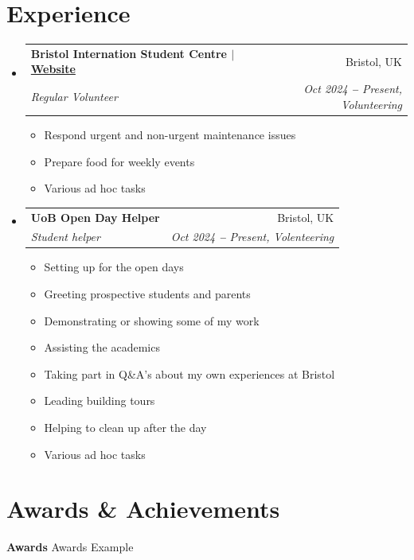 \documentclass[letterpaper,11pt]{article}
\makeatletter
\newcommand{\resumeItem}[1]{
  \item\small{
    {#1 \vspace{-2pt}}
  }
}
\newcommand{\resumeSubheading}[4]{
  \vspace{-2pt}\item
    \begin{tabular*}{0.97\textwidth}[t]{l@{\extracolsep{\fill}}r}
      \textbf{#1} & #2 \\
      \textit{\small#3} & \textit{\small #4} \\
    \end{tabular*}\vspace{-7pt}
}
\newcommand{\resumeSubHeadingListStart}{\begin{itemize}[leftmargin=0.15in, label={}]}
\newcommand{\resumeSubHeadingListEnd}{\end{itemize}}
\newcommand{\resumeItemListStart}{\begin{itemize}}
\newcommand{\resumeItemListEnd}{\end{itemize}\vspace{-5pt}}
\makeatother
\begin{document}

\section{Experience}
  \vspace{3pt}
  \resumeSubHeadingListStart

    \resumeSubheading
      {Bristol Internation Student Centre $|$ \href{https://bisc.org.uk}{\color{blue}Website}}{Bristol, UK}
      {Regular Volunteer}{Oct 2024 \textbf{--} Present, Volunteering}
        \resumeItemListStart
            \resumeItem{Respond urgent and non-urgent maintenance issues}
            \resumeItem{Prepare food for weekly events}
            \resumeItem{Various ad hoc tasks}
        \resumeItemListEnd

    \resumeSubheading
      {UoB Open Day Helper}{Bristol, UK}
      {Student helper}{Oct 2024 \textbf{--} Present, Volenteering}
        \resumeItemListStart
            \resumeItem{Setting up for the open days}
            \resumeItem{Greeting prospective students and parents}
            \resumeItem{Demonstrating or showing some of my work}
            \resumeItem{Assisting the academics}
            \resumeItem{Taking part in Q\&A's about my own experiences at Bristol}
            \resumeItem{Leading building tours}
            \resumeItem{Helping to clean up after the day}
            \resumeItem{Various ad hoc tasks}
        \resumeItemListEnd

\resumeSubHeadingListEnd



\section{Awards \& Achievements}
  \vspace{2pt}
  \resumeSubHeadingListStart
    \small{\item{
        \textbf{Awards}{ Awards Example} \\ \vspace{3pt}
    

    }}
  \resumeSubHeadingListEnd
\end{document}
